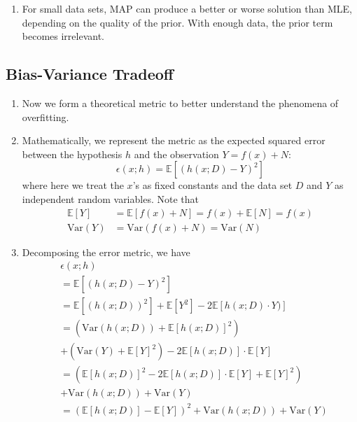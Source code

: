 \documentclass[10pt]{article}
\begin{document}
\begin{multicols}{2}
\begin{addmargin}[0.8em]{0.5em}
\begin{enumerate}[label=(\alph*)]
        \item For small data sets, MAP can produce a better or worse solution than MLE, depending on the quality of the prior. With enough data, the prior term becomes irrelevant.
    \end{enumerate}    

    \subsection{Bias-Variance Tradeoff}
    \begin{enumerate}[label=(\alph*)]
        \item Now we form a theoretical metric to better understand the phenomena of overfitting. 
        \item Mathematically, we represent the metric as the expected squared error between the hypothesis $h$ and the observation $Y = f(x) + N$:
        $$
        \epsilon(x;h) = \mathbb{E} \left[ (h(x;D) - Y)^2 \right]
        $$
        where here we treat the $x$'s as fixed constants and the data set $D$ and $Y$ as independent random variables. Note that
        \begin{align*}
        \mathbb{E}[Y] &= \mathbb{E} \left[ f(x) + N \right] = f(x) + \mathbb{E} \left[ N \right] = f(x) \\
        \text{Var}(Y) &= \text{Var}(f(x) + N) = \text{Var}(N)
        \end{align*}
        \item Decomposing the error metric, we have
        \begin{align*}
        &\epsilon(x;h) \\
        &= \mathbb{E} \left[ (h(x;D) - Y)^2 \right] \\
        &= \mathbb{E} \left[ (h(x;D))^2 \right] + \mathbb{E} \left[ Y^2 \right] -2 \mathbb{E} \left[ h(x;D) \cdot Y) \right] \\
        &= \left( \text{Var}(h(x;D)) + \mathbb{E} \left[ h(x;D) \right]^2 \right) \\
        &+ \left( \text{Var}(Y) + \mathbb{E}[Y]^2 \right) -2 \mathbb{E} \left[ h(x;D) \right] \cdot \mathbb{E}[Y] \\
        &= \left( \mathbb{E} \left[ h(x;D) \right]^2 - 2 \mathbb{E}[h(x;D)] \cdot \mathbb{E}[Y] + \mathbb{E}[Y]^2 \right) \\
        &+ \text{Var}(h(x;D)) + \text{Var}(Y) \\
        &= \left( \mathbb{E} \left[ h(x;D) \right] - \mathbb{E}[Y] \right)^2 + \text{Var}(h(x;D)) + \text{Var}(Y) \\

\end{align*}
\end{enumerate}
\end{addmargin}
\end{multicols}
\end{document}
